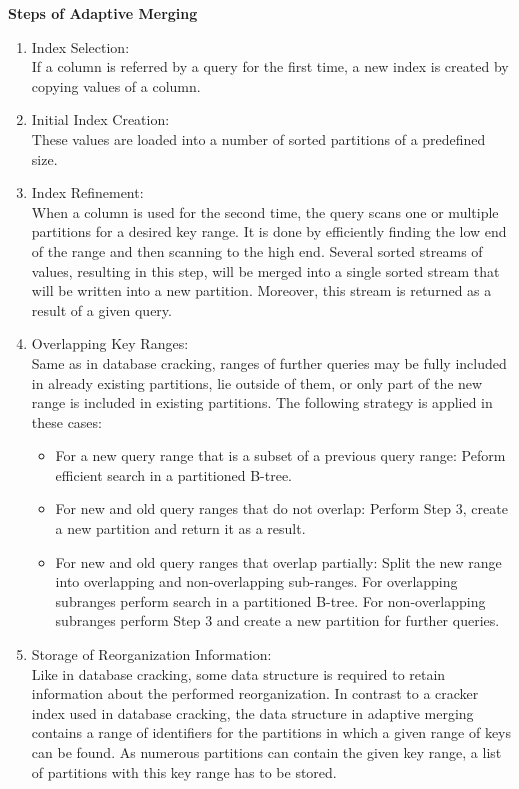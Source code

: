 \documentclass[10pt, conference, compsocconf]{IEEEtran}
\begin{document}
\textbf{Steps of Adaptive Merging} 
\begin{enumerate}
\item{Index Selection:}\\
If a column is referred by a query for the first time, a new index is created by copying values of a column. \\
\item{Initial Index Creation:}\\
These values are loaded into a number of sorted partitions of a predefined size. \\
\item{Index Refinement:}\\
When a column is used for the second time, the query scans one or multiple partitions for a desired key range. It is done by efficiently finding the low end of the range and then scanning to the high end. Several sorted streams of values, resulting in this step, will be merged into a single sorted stream that will be written into a new partition. Moreover, this stream is returned as a result of a given query.\\
\item{Overlapping Key Ranges:}\\
Same as in database cracking, ranges of further queries may be fully included in already existing partitions, lie outside of them, or only part of the new range is included in existing partitions. The following strategy is applied in these cases:
\begin{itemize}
\item{For a new query range that is a subset of a previous query range: }
Peform efficient search in a partitioned B-tree.\\
\item{For new and old query ranges that do not overlap: }
Perform Step 3, create a new partition and return it as a result.\\
\item{For new and old query ranges that overlap partially: }
Split the new range into overlapping and non-overlapping sub-ranges. For overlapping subranges perform search in a partitioned B-tree. For non-overlapping subranges perform Step 3 and create a new partition for further queries.\\
\end{itemize}
\item{Storage of Reorganization Information:}\\
Like in database cracking, some data structure is required to retain information about the performed reorganization. In contrast to a cracker index used in database cracking, the data structure in adaptive merging contains a range of identifiers for the partitions in which a given range of keys can be found. As numerous partitions can contain the given key range, a list of partitions with this key range has to be stored.
\end{enumerate}
\end{document}
